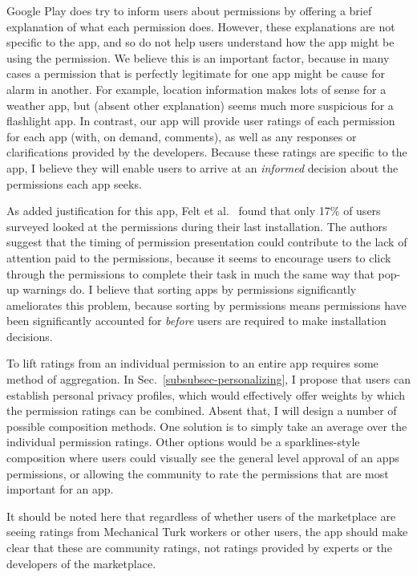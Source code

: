 \documentclass[11pt]{article}
\begin{document}
Google Play does try to inform users about permissions by offering a
brief explanation of what each permission does. However, these
explanations are not specific to the app, and so do not help
users understand how the app might be using the permission. We
believe this is an important factor, because in many cases a
permission that is perfectly legitimate for one app might be cause for
alarm in another. For example, location information makes lots of
sense for a weather app, but (absent other explanation) seems much
more suspicious for a flashlight app. In contrast, our app will
provide user ratings of each permission for each app (with, on demand,
comments), as well as any responses or clarifications provided by the
developers. Because these ratings are specific to the app, I believe
they will enable users to arrive at an \emph{informed} decision about
the permissions each app seeks.

As added justification for this app, Felt et al.\ \cite{android-attention-SOUPS12} 
found that only 17\% of users surveyed looked at the permissions during
their last installation. The authors suggest that the timing of
permission presentation could contribute to the lack of attention paid
to the permissions, because it seems to encourage users to click
through the permissions to complete their task in much the same way
that pop-up warnings do. I believe that sorting apps by permissions
significantly ameliorates this problem, because sorting by permissions
means permissions have been significantly accounted for \emph{before}
users are required to make installation decisions.

To lift ratings from an individual permission to an entire app
requires some method of aggregation. In 
Sec.~\ref{subsubsec-personalizing}, I propose that users
can establish personal privacy profiles, which would effectively offer
weights by which the permission ratings can be combined. Absent that, I will design a
number of possible composition methods. One solution is to simply take
an average over the individual permission ratings. Other options would
be a sparklines-style composition where users could visually see the
general level approval of an apps permissions, or allowing the
community to rate the permissions that are most important for an app.

It should be noted here that regardless of whether users of the
marketplace are seeing ratings from Mechanical Turk workers or other
users, the app should make clear that these are community ratings, not
ratings provided by experts or the developers of the marketplace.
\end{document}
